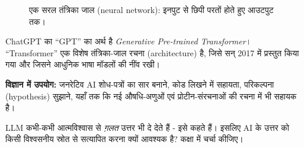 \begin{figure}[h]
\centering
{}
\caption{एक सरल तंत्रिका जाल (neural network): इनपुट से छिपी परतों होते हुए आउटपुट तक।}
\label{fig:neural-net}
\end{figure}

\begin{jante}
ChatGPT का “GPT” का अर्थ है \emph{Generative Pre-trained Transformer}।
“Transformer” एक विशेष तंत्रिका-जाल रचना (architecture) है, जिसे सन् 2017 में
प्रस्तुत किया गया और जिसने आधुनिक भाषा मॉडलों की नींव रखी।
\end{jante}

\noindent\textbf{विज्ञान में उपयोग:} जनरेटिव AI शोध-पत्रों का सार बनाने, कोड लिखने में
सहायता, परिकल्पना (hypothesis) सुझाने, यहाँ तक कि नई औषधि-अणुओं एवं प्रोटीन-संरचनाओं
की रचना में भी सहायक है।

\begin{sochiye}
LLM कभी-कभी आत्मविश्वास से \emph{ग़लत} उत्तर भी दे देते हैं - इसे
 कहते हैं। इसलिए AI के उत्तर को किसी विश्वसनीय स्रोत से
सत्यापित करना क्यों आवश्यक है? कक्षा में चर्चा कीजिए।
\end{sochiye}

